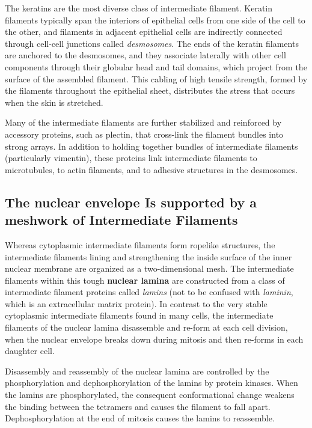 The keratins are the most diverse class of intermediate filament.
Keratin filaments typically span the interiors of epithelial
cells from one side of the cell to the other, and filaments in adjacent
epithelial cells are indirectly connected through cell-cell junctions
called \textit{desmosomes}. The ends of the keratin filaments
are anchored to the desmosomes, and they associate laterally
with other cell components through their globular head and tail domains,
which project from the surface of the assembled filament. This cabling
of high tensile strength, formed by the filaments throughout the epithelial
sheet, distributes the stress that occurs when the skin is stretched.

Many of the intermediate filaments are further stabilized and reinforced
by accessory proteins, such as plectin, that cross-link the filament bundles
into strong arrays. In addition to holding together bundles of intermediate
filaments (particularly vimentin), these proteins link intermediate filaments
to microtubules, to actin filaments, and to adhesive structures in
the desmosomes.

\subsection{The nuclear envelope Is supported by a meshwork of Intermediate Filaments}

Whereas cytoplasmic intermediate filaments form ropelike structures,
the intermediate filaments lining and strengthening the inside surface of
the inner nuclear membrane are organized as a two-dimensional mesh.
The intermediate filaments within this tough \textbf{nuclear lamina} are constructed
from a class of intermediate filament proteins called
\textit{lamins} (not to be confused with \textit{laminin}, which is an extracellular matrix
protein). In contrast to the very stable cytoplasmic intermediate filaments
found in many cells, the intermediate filaments of the nuclear lamina
disassemble and re-form at each cell division, when the nuclear envelope
breaks down during mitosis and then re-forms in each daughter cell.

Disassembly and reassembly of the nuclear lamina are controlled by
the phosphorylation and dephosphorylation of
the lamins by protein kinases. When the lamins are phosphorylated, the
consequent conformational change weakens the binding between the
tetramers and causes the filament to fall apart. Dephosphorylation at the
end of mitosis causes the lamins to reassemble.

